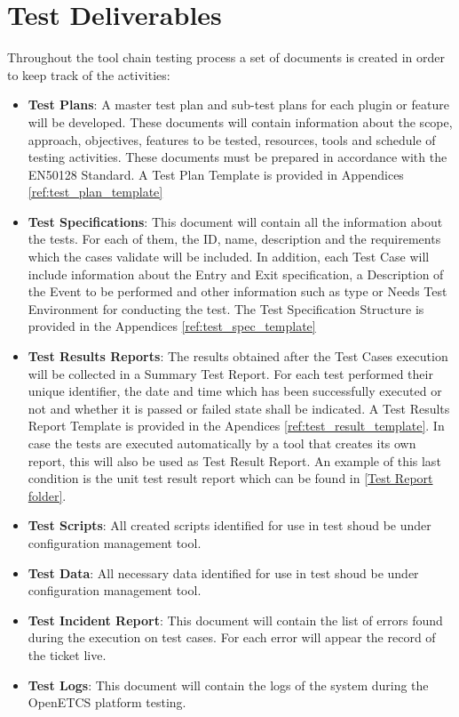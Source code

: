 \section{Test Deliverables}
Throughout the tool chain testing process a set of documents is created in order to keep track of the activities:
\begin{itemize}
\item \textbf{Test Plans}: A master test plan and sub-test plans for each plugin or feature will be developed. These documents will contain information about the scope, approach, objectives, features to be tested, resources, tools and schedule of testing activities.  These documents must be prepared in accordance with the EN50128 Standard. A Test Plan Template is provided in Appendices \ref{ref:test_plan_template}
\item \textbf{Test Specifications}: This document will contain all the information about the tests. For each of them, the ID, name, description and the requirements which the cases validate will be included. In addition, each Test Case will include information about the Entry and Exit specification, a Description of the Event to be performed and other information such as type or Needs Test Environment for conducting the test. The Test Specification Structure is provided in the Appendices \ref{ref:test_spec_template}
\item \textbf{Test Results Reports}: The results obtained after the Test Cases execution will be collected in a Summary Test Report. For each test performed their unique identifier, the date and time which has been successfully executed or not and whether it is passed or failed state shall be indicated. A Test Results Report Template is provided in the Apendices \ref{ref:test_result_template}. In case the tests are executed automatically by a tool that creates its own report, this will also be used as Test Result Report. An example of this last condition is the unit test result report which can be found in \href{https://openetcs.ci.cloudbees.com/job/openETCS-tycho/lastBuild/testReport/}{[Test Report folder]}.
\item \textbf{Test Scripts}: All created scripts identified for use in test shoud be under configuration management tool.
\item \textbf{Test Data}: All necessary data identified for use in test shoud be under configuration management tool.
\item \textbf{Test Incident Report}: This document will contain the list of errors found during the execution on test cases. For each error will appear the record of the ticket live.  
\item \textbf{Test Logs}: This document will contain the logs of the system during the OpenETCS platform testing.
\end{itemize}

